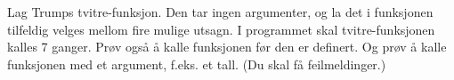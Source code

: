 %
%
Lag Trumps tvitre-funksjon. Den tar ingen argumenter, og la det i funksjonen tilfeldig velges mellom fire mulige utsagn. I programmet skal tvitre-funksjonen kalles 7 ganger. Prøv også å kalle funksjonen før den er definert. Og prøv å kalle funksjonen med et argument, f.eks. et tall. (Du skal få feilmeldinger.)
